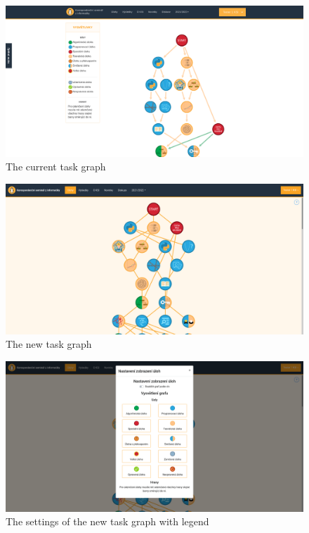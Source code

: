 \documentclass[
  digital, %
  oneside, %
  lof,     %
  lot,     %
]{fithesis4}
\begin{document}
{\begin{figure}
\includegraphics[width=\textwidth]{assets/img/graph_curr}
\caption{The current task graph}
\label{fig:graph-curr}
\end{figure}

\begin{figure}
\includegraphics[width=\textwidth]{assets/img/graph_new}
\caption{The new task graph}
\label{fig:graph-new}
\end{figure}

\begin{figure}
\includegraphics[width=\textwidth]{assets/img/graph_newsettings}
\caption{The settings of the new task graph with legend}
\label{fig:graph-new-settings}
\end{figure}

}
\end{document}
